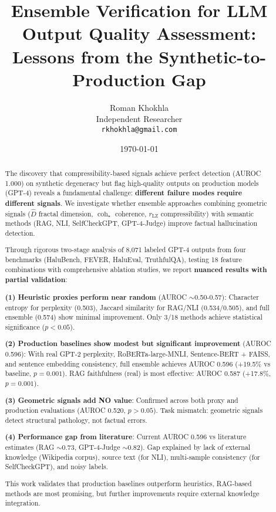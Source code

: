 \documentclass[11pt]{article}
\title{Ensemble Verification for LLM Output Quality Assessment:\\
\textbf{Lessons from the Synthetic-to-Production Gap}}
\author{
  Roman Khokhla\\
  Independent Researcher\\
  \texttt{rkhokhla@gmail.com}
}
\date{\today}
\begin{document}
\maketitle

\begin{abstract}
The discovery that compressibility-based signals achieve perfect detection (AUROC 1.000) on synthetic degeneracy but flag high-quality outputs on production models (GPT-4) reveals a fundamental challenge: \textbf{different failure modes require different signals}. We investigate whether ensemble approaches combining geometric signals ($\hat{D}$ fractal dimension, $\operatorname{coh}_\star$ coherence, $r_{\text{LZ}}$ compressibility) with semantic methods (RAG, NLI, SelfCheckGPT, GPT-4-Judge) improve factual hallucination detection.

Through rigorous two-stage analysis of 8,071 labeled GPT-4 outputs from four benchmarks (HaluBench, FEVER, HaluEval, TruthfulQA), testing 18 feature combinations with comprehensive ablation studies, we report \textbf{nuanced results with partial validation}:

\textbf{(1) Heuristic proxies perform near random} (AUROC $\sim$0.50-0.57): Character entropy for perplexity (0.503), Jaccard similarity for RAG/NLI (0.534/0.505), and full ensemble (0.574) show minimal improvement. Only 3/18 methods achieve statistical significance ($p < 0.05$).

\textbf{(2) Production baselines show modest but significant improvement} (AUROC 0.596): With real GPT-2 perplexity, RoBERTa-large-MNLI, Sentence-BERT + FAISS, and sentence embedding consistency, full ensemble achieves AUROC 0.596 (+19.5\% vs baseline, $p=0.001$). RAG faithfulness (real) is most effective: AUROC 0.587 (+17.8\%, $p=0.001$).

\textbf{(3) Geometric signals add NO value}: Confirmed across both proxy and production evaluations (AUROC 0.520, $p > 0.05$). Task mismatch: geometric signals detect structural pathology, not factual errors.

\textbf{(4) Performance gap from literature}: Current AUROC 0.596 vs literature estimates (RAG $\sim$0.73, GPT-4-Judge $\sim$0.82). Gap explained by lack of external knowledge (Wikipedia corpus), source text (for NLI), multi-sample consistency (for SelfCheckGPT), and noisy labels.

This work validates that production baselines outperform heuristics, RAG-based methods are most promising, but further improvements require external knowledge integration.
\end{abstract}
\end{document}
